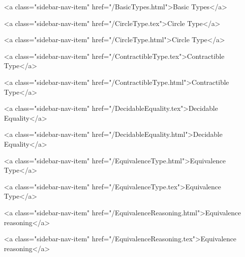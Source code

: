       
    
      
        
          <a class="sidebar-nav-item" href="/BasicTypes.html">Basic Types</a>
        
      
    
      
        
          <a class="sidebar-nav-item" href="/CircleType.tex">Circle Type</a>
        
      
    
      
        
          <a class="sidebar-nav-item" href="/CircleType.html">Circle Type</a>
        
      
    
      
        
          <a class="sidebar-nav-item" href="/ContractibleType.tex">Contractible Type</a>
        
      
    
      
        
          <a class="sidebar-nav-item" href="/ContractibleType.html">Contractible Type</a>
        
      
    
      
        
          <a class="sidebar-nav-item" href="/DecidableEquality.tex">Decidable Equality</a>
        
      
    
      
        
          <a class="sidebar-nav-item" href="/DecidableEquality.html">Decidable Equality</a>
        
      
    
      
        
          <a class="sidebar-nav-item" href="/EquivalenceType.html">Equivalence Type</a>
        
      
    
      
        
          <a class="sidebar-nav-item" href="/EquivalenceType.tex">Equivalence Type</a>
        
      
    
      
        
          <a class="sidebar-nav-item" href="/EquivalenceReasoning.html">Equivalence reasoning</a>
        
      
    
      
        
          <a class="sidebar-nav-item" href="/EquivalenceReasoning.tex">Equivalence reasoning</a>
        
